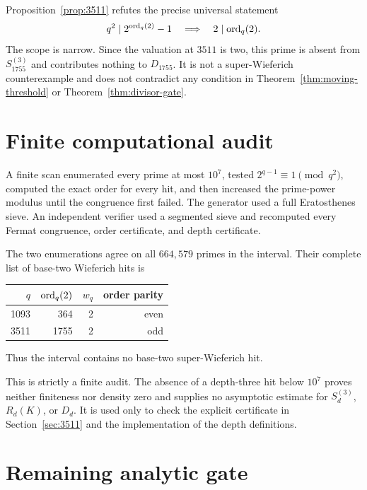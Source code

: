 Proposition~\ref{prop:3511} refutes the precise universal statement
\begin{equation}
 q^2\mid2^{\operatorname{ord}_q(2)}-1
 \quad\Longrightarrow\quad
 2\mid\operatorname{ord}_q(2).
 \label{eq:false-parity-claim}
\end{equation}
The scope is narrow.  Since the valuation at $3511$ is two, this prime is
absent from $S_{1755}^{(3)}$ and contributes nothing to $D_{1755}$.  It is
not a super-Wieferich counterexample and does not contradict any condition
in Theorem~\ref{thm:moving-threshold} or
Theorem~\ref{thm:divisor-gate}.

\section{Finite computational audit}
\label{sec:scan}

A finite scan enumerated every prime at most $10^7$, tested
$2^{q-1}\equiv1\pmod{q^2}$, computed the exact order for every hit, and
then increased the prime-power modulus until the congruence first failed.
The generator used a full Eratosthenes sieve.  An independent verifier used
a segmented sieve and recomputed every Fermat congruence, order certificate,
and depth certificate.

The two enumerations agree on all $664{,}579$ primes in the interval.  Their
complete list of base-two Wieferich hits is
\begin{center}
\begin{tabular}{@{}rrrr@{}}
\toprule
$q$ & $\operatorname{ord}_q(2)$ & $w_q$ & order parity\\
\midrule
1093 & 364  & 2 & even\\
3511 & 1755 & 2 & odd\\
\bottomrule
\end{tabular}
\end{center}
Thus the interval contains no base-two super-Wieferich hit.

This is strictly a finite audit.  The absence of a depth-three hit below
$10^7$ proves neither finiteness nor density zero and supplies no
asymptotic estimate for $S_d^{(3)}$, $R_d(K)$, or $D_d$.  It is used only
to check the explicit certificate in Section~\ref{sec:3511} and the
implementation of the depth definitions.

\section{Remaining analytic gate}
\label{sec:open}

